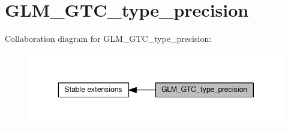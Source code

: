 \hypertarget{group__gtc__type__precision}{}\section{G\+L\+M\+\_\+\+G\+T\+C\+\_\+type\+\_\+precision}
\label{group__gtc__type__precision}
Collaboration diagram for G\+L\+M\+\_\+\+G\+T\+C\+\_\+type\+\_\+precision\+:
\nopagebreak
\begin{figure}[H]
\begin{center}
\leavevmode
\includegraphics[width=343pt]{d3/d2d/group__gtc__type__precision}
\end{center}
\end{figure}
